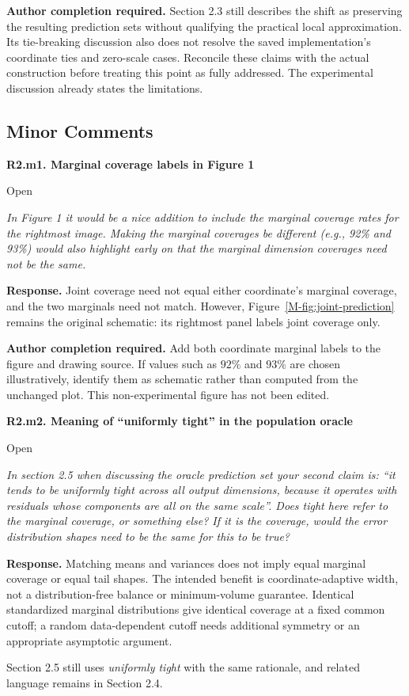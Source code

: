 \documentclass[11pt]{article}
\newcommand{\msfig}[1]{Figure~\ref*{M-#1}}
\newcommand{\action}[1]{\par{\small\color{ActionRed}\textbf{Author completion required.} #1\par}}
\newcommand{\point}[3]{\par\Needspace{7\baselineskip}\medskip
\noindent\parbox[t]{0.77\linewidth}{\textbf{#1}}\hfill
\parbox[t]{0.21\linewidth}{\raggedleft\small\sffamily #2}\par\nopagebreak
{\color{ReviewerBlue}\small\itshape #3\par}\textbf{Response.} }
\begin{document}
\action{Section 2.3 still describes the shift as preserving the resulting prediction sets without qualifying the practical local approximation. Its tie-breaking discussion also does not resolve the saved implementation's coordinate ties and zero-scale cases. Reconcile these claims with the actual construction before treating this point as fully addressed. The experimental discussion already states the limitations.}

\subsection*{Minor Comments}

\point{R2.m1. Marginal coverage labels in Figure 1}{Open}{In Figure 1 it would be a nice addition to include the marginal
coverage rates for the rightmost image. Making the marginal
coverages be different (e.g., 92\% and 93\%) would also highlight
early on that the marginal dimension coverages need not be the same.}
\label{response:R2.m1}
Joint coverage need not equal either coordinate's marginal coverage, and the two marginals need not match. However, \msfig{fig:joint-prediction} remains the original schematic: its rightmost panel labels joint coverage only.

\action{Add both coordinate marginal labels to the figure and drawing source. If values such as $92\%$ and $93\%$ are chosen illustratively, identify them as schematic rather than computed from the unchanged plot. This non-experimental figure has not been edited.}

\point{R2.m2. Meaning of ``uniformly tight'' in the population oracle}{Open}{In section 2.5 when discussing the oracle prediction set your
second claim is: ``it tends to be uniformly tight across all
output dimensions, because it operates with residuals whose
components are all on the same scale''. Does tight here refer
to the marginal coverage, or something else? If it is the
coverage, would the error distribution shapes need to be the
same for this to be true?}
\label{response:R2.m2}
Matching means and variances does not imply equal marginal coverage or equal tail shapes. The intended benefit is coordinate-adaptive width, not a distribution-free balance or minimum-volume guarantee. Identical standardized marginal distributions give identical coverage at a fixed common cutoff; a random data-dependent cutoff needs additional symmetry or an appropriate asymptotic argument.

Section 2.5 still uses \emph{uniformly tight} with the same rationale, and related language remains in Section 2.4.
\end{document}
